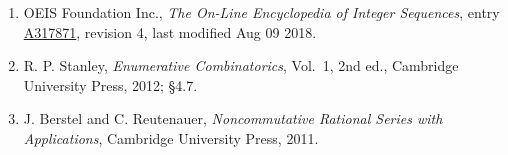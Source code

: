 \documentclass[11pt]{article}
\theoremstyle{definition}
\begin{document}
\begin{enumerate}

\item OEIS Foundation Inc., \emph{The On-Line Encyclopedia of Integer Sequences}, entry \href{https://oeis.org/A317871}{A317871}, revision 4, last modified Aug 09 2018.

\item R. P. Stanley, \emph{Enumerative Combinatorics}, Vol.~1, 2nd ed., Cambridge University Press, 2012; \S4.7.

\item J. Berstel and C. Reutenauer, \emph{Noncommutative Rational Series with Applications}, Cambridge University Press, 2011.

\end{enumerate}
\end{document}
